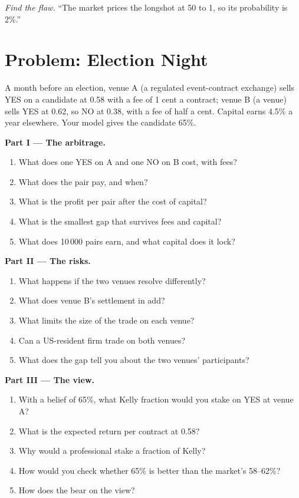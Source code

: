 \begin{exercise}[$\star\star\star$]\label{exo:m3:prediction-and-betting-markets:8}
\emph{Find the flaw.} ``The market prices the longshot at 50 to 1, so its probability is 2\%.''
\end{exercise}

\section{Problem: Election Night}

\begin{problem}\label{pb:m3:prediction-and-betting-markets:1}
A month before an election, venue A (a regulated event-contract exchange) sells YES on a candidate at 0.58 with a fee of 1 cent a contract; venue B (a
 venue) sells YES at 0.62, so NO at 0.38, with a fee of half a cent. Capital earns 4.5\% a year elsewhere. Your model gives the candidate 65\%.

\medskip\noindent\textbf{Part I --- The arbitrage.}
\begin{enumerate}
\item What does one YES on A and one NO on B cost, with fees?
\item What does the pair pay, and when?
\item What is the profit per pair after the cost of capital?
\item What is the smallest gap that survives fees and capital?
\item What does 10\,000 pairs earn, and what capital does it lock?
\end{enumerate}

\medskip\noindent\textbf{Part II --- The risks.}
\begin{enumerate}[resume]
\item What happens if the two venues resolve differently?
\item What does venue B's settlement in  add?
\item What limits the size of the trade on each venue?
\item Can a US-resident firm trade on both venues?
\item What does the gap tell you about the two venues' participants?
\end{enumerate}

\medskip\noindent\textbf{Part III --- The view.}
\begin{enumerate}[resume]
\item With a belief of 65\%, what Kelly fraction would you stake on YES at venue A?
\item What is the expected return per contract at 0.58?
\item Why would a professional stake a fraction of Kelly?
\item How would you check whether 65\% is better than the market's 58--62\%?
\item How does the  bear on the view?
\end{enumerate}


\end{problem}
